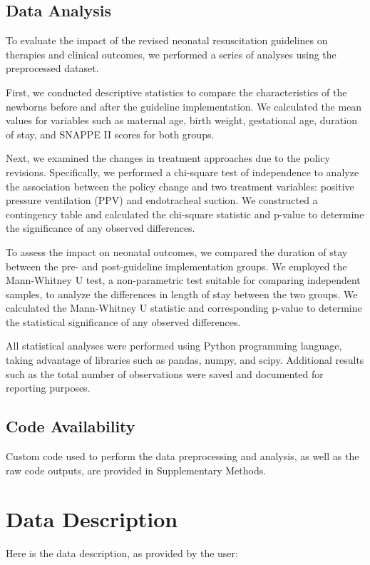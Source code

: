 \documentclass[11pt]{article}
\begin{document}
\subsection*{Data Analysis}
To evaluate the impact of the revised neonatal resuscitation guidelines on therapies and clinical outcomes, we performed a series of analyses using the preprocessed dataset.

First, we conducted descriptive statistics to compare the characteristics of the newborns before and after the guideline implementation. We calculated the mean values for variables such as maternal age, birth weight, gestational age, duration of stay, and SNAPPE II scores for both groups.

Next, we examined the changes in treatment approaches due to the policy revisions. Specifically, we performed a chi-square test of independence to analyze the association between the policy change and two treatment variables: positive pressure ventilation (PPV) and endotracheal suction. We constructed a contingency table and calculated the chi-square statistic and p-value to determine the significance of any observed differences.

To assess the impact on neonatal outcomes, we compared the duration of stay between the pre- and post-guideline implementation groups. We employed the Mann-Whitney U test, a non-parametric test suitable for comparing independent samples, to analyze the differences in length of stay between the two groups. We calculated the Mann-Whitney U statistic and corresponding p-value to determine the statistical significance of any observed differences.

All statistical analyses were performed using Python programming language, taking advantage of libraries such as pandas, numpy, and scipy. Additional results such as the total number of observations were saved and documented for reporting purposes.\subsection*{Code Availability}

Custom code used to perform the data preprocessing and analysis, as well as the raw code outputs, are provided in Supplementary Methods.


\clearpage
\appendix

\section{Data Description} \label{sec:data_description} Here is the data description, as provided by the user:
\end{document}
